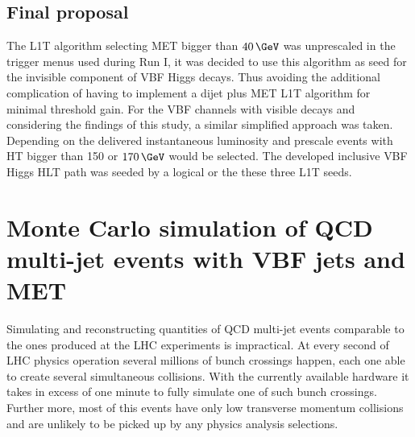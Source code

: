 \subsection{Final proposal}


The \gls{L1T} algorithm selecting \gls{MET} bigger than $40\,\GeV$ was unprescaled in the trigger menus used during Run I, it was decided to use this algorithm as seed for the invisible component of \gls{VBF} Higgs decays. Thus avoiding the additional complication of having to implement a dijet plus \gls{MET} \gls{L1T} algorithm for minimal threshold gain. For the \gls{VBF} channels with visible decays and considering the findings of this study, a similar simplified approach was taken. Depending on the delivered instantaneous luminosity and prescale events with \gls{HT} bigger than 150 or $170\,\GeV$ would be selected. The developed inclusive \gls{VBF} Higgs \gls{HLT} path was seeded by a logical or the these three \gls{L1T} seeds.

\section{Monte Carlo simulation of QCD multi-jet events with VBF jets and MET}
\label{SECTION:PreparationParkedDataAnalysis_QCDVBFMET}

% 


Simulating and reconstructing quantities of \gls{QCD} multi-jet events comparable to the ones produced at the \gls{LHC} experiments is impractical. At every second of \gls{LHC} physics operation several millions of bunch crossings happen, each one able to create several simultaneous collisions. With the currently available hardware it takes in excess of one minute to fully simulate one of such bunch crossings. Further more, most of this events have only low transverse momentum collisions and are unlikely to be picked up by any physics analysis selections.

